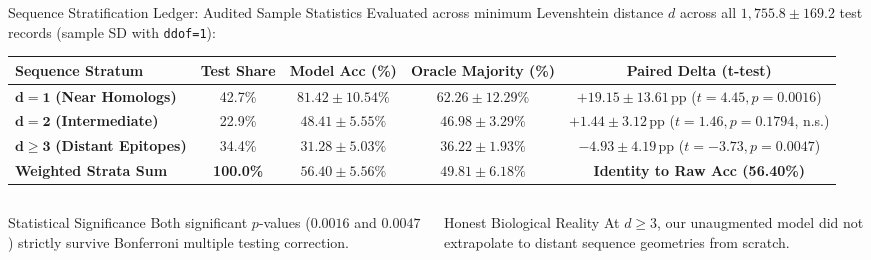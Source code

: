 \documentclass[aspectratio=169,10pt]{beamer}
\begin{document}
\begin{frame}{Sequence Stratification Ledger: Audited Sample Statistics}
  \small
  Evaluated across minimum Levenshtein distance $d$ across all $1{,}755.8 \pm 169.2$ test records (sample SD with \lstinline|ddof=1|):
  \vspace{0.1cm}
  \begin{table}[h]
    \centering
    \scriptsize
    \begin{tabular}{@{}lcccc@{}}
      \toprule
      \textbf{Sequence Stratum} & \textbf{Test Share} & \textbf{Model Acc (\%)} & \textbf{Oracle Majority (\%)} & \textbf{Paired Delta (t-test)} \\
      \midrule
      $\mathbf{d = 1}$ \textbf{(Near Homologs)}    & 42.7\% & $\mathbf{81.42 \pm 10.54\%}$ & $62.26 \pm 12.29\%$ & $\mathbf{+19.15 \pm 13.61}$\,pp ($t=4.45, p=0.0016$) \\
      $\mathbf{d = 2}$ \textbf{(Intermediate)}     & 22.9\% & $48.41 \pm 5.55\%$            & $46.98 \pm 3.29\%$  & $+1.44 \pm 3.12$\,pp ($t=1.46, p=0.1794$, n.s.) \\
      $\mathbf{d \ge 3}$ \textbf{(Distant Epitopes)}& 34.4\% & $31.28 \pm 5.03\%$            & $36.22 \pm 1.93\%$  & $\mathbf{-4.93 \pm 4.19}$\,pp ($t=-3.73, p=0.0047$) \\
      \midrule
      \textbf{Weighted Strata Sum} & \textbf{100.0\%} & $\mathbf{56.40 \pm 5.56\%}$ & $\mathbf{49.81 \pm 6.18\%}$ & \textbf{Identity to Raw Acc (56.40\%)} \\
      \bottomrule
    \end{tabular}
  \end{table}
  \begin{columns}[T]
    \begin{column}{0.5\textwidth}
      \begin{block}{Statistical Significance}
        \scriptsize
        Both significant $p$-values ($0.0016$ and $0.0047$) strictly survive Bonferroni multiple testing correction.
      \end{block}
    \end{column}
    \begin{column}{0.5\textwidth}
      \begin{block}{Honest Biological Reality}
        \scriptsize
        At $d \ge 3$, our unaugmented model did not extrapolate to distant sequence geometries from scratch.
      \end{block}
    \end{column}
  \end{columns}
\end{frame}
\end{document}
